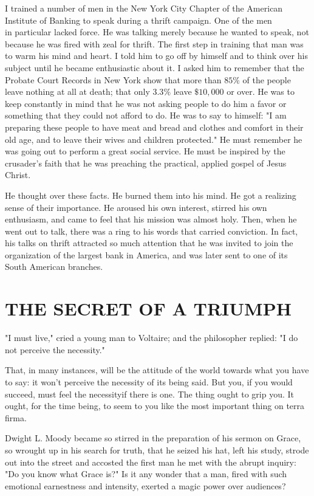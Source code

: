 \documentclass[10pt]{article}
\begin{document}
I trained a number of men in the New York City Chapter of the American Institute of Banking to speak during a thrift campaign. One of the men\\
in particular lacked force. He was talking merely because he wanted to speak, not because he was fired with zeal for thrift. The first step in training that man was to warm his mind and heart. I told him to go off by himself and to think over his subject until he became enthusiastic about it. I asked him to remember that the Probate Court Records in New York show that more than $85 \%$ of the people leave nothing at all at death; that only $3.3 \%$ leave $\$ 10,000$ or over. He was to keep constantly in mind that he was not asking people to do him a favor or something that they could not afford to do. He was to say to himself: "I am preparing these people to have meat and bread and clothes and comfort in their old age, and to leave their wives and children protected." He must remember he was going out to perform a great social service. He must be inspired by the crusader's faith that he was preaching the practical, applied gospel of Jesus Christ.

He thought over these facts. He burned them into his mind. He got a realizing sense of their importance. He aroused his own interest, stirred his own enthusiasm, and came to feel that his mission was almost holy. Then, when he went out to talk, there was a ring to his words that carried conviction. In fact, his talks on thrift attracted so much attention that he was invited to join the organization of the largest bank in America, and was later sent to one of its South American branches.

\section*{THE SECRET OF A TRIUMPH}
"I must live," cried a young man to Voltaire; and the philosopher replied: "I do not perceive the necessity."

That, in many instances, will be the attitude of the world towards what you have to say: it won't perceive the necessity of its being said. But you, if you would succeed, must feel the necessityif there is one. The thing ought to grip you. It ought, for the time being, to seem to you like the most important thing on terra firma.

Dwight L. Moody became so stirred in the preparation of his sermon on Grace, so wrought up in his search for truth, that he seized his hat, left his study, strode out into the street and accosted the first man he met with the abrupt inquiry: "Do you know what Grace is?" Is it any wonder that a man, fired with such emotional earnestness and intensity, exerted a magic power over audiences?
\end{document}
